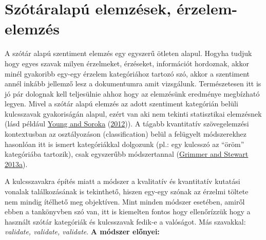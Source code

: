 \documentclass[
]{book}
\begin{document}
\hypertarget{szuxf3tuxe1ralapuxfa-elemzuxe9sek-uxe9rzelem-elemzuxe9s}{%
\chapter{Szótáralapú elemzések,
érzelem-elemzés}\label{szuxf3tuxe1ralapuxfa-elemzuxe9sek-uxe9rzelem-elemzuxe9s}}

A szótár alapú szentiment elemzés egy egyszerű ötleten alapul. Hogyha
tudjuk hogy egyes szavak milyen érzelmeket, érzéseket, információt
hordoznak, akkor minél gyakoribb egy-egy érzelem kategóriához tartozó
szó, akkor a szentiment annél inkább jellemző lesz a dokumentumra amit
vizsgálunk. Természetesen itt is jó pár dolognak kell teljesülnie ahhoz
hogy az elemzésünk eredménye megbízható legyen. Mivel a szótár alapú
elemzés az adott szentiment kategórián belüli kulcsszavak gyakoriságán
alapul, ezért van aki nem tekinti statisztikai elemzésnek (lásd például
\protect\hyperlink{ref-young2012affective}{Young and Soroka}
(\protect\hyperlink{ref-young2012affective}{2012})). A tágabb
kvantitatív szövegelemzési kontextusban az osztályozáson
(classification) belül a felügyelt módszerekhez hasonlóan itt is ismert
kategóriákkal dolgozunk (pl.: egy kulcsszó az ``öröm'' kategóriába
tartozik), csak egyszerűbb módszertannal
(\protect\hyperlink{ref-grimmer2013text}{Grimmer and Stewart 2013a}).

A kulcsszavakra építés miatt a módszer a kvalitatív és kvantitatív
kutatási vonalak találkozásának is tekinthető, hiszen egy-egy szónak az
érzelmi töltete nem mindig ítélhető meg objektíven. Mint minden módszer
esetében, amiről ebben a tankönyvben szó van, itt is kiemelten fontos
hogy ellenőrízzük hogy a használt szótár kategóriák és kulcsszavak
fedik-e a valóságot. Más szavakkal: \emph{validate, validate, validate}.
\textbf{A módszer előnyei:}
\end{document}
